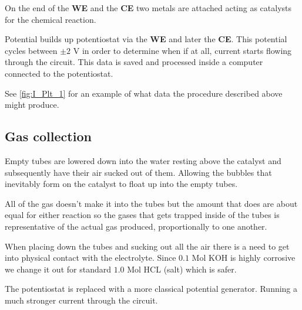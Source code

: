 \documentclass[twocolumn, floatfix]{revtex4-2}
\begin{document}
On the end of the \textbf{WE} and the \textbf{CE} two metals are attached acting 
as catalysts for the chemical reaction. 

\par
Potential builds up potentiostat via the \textbf{WE} and later the \textbf{CE}. This potential cycles
between $\pm 2$ V in order to determine when if at all, current starts flowing through the circuit.
This data is saved and processed inside a computer connected to the potentiostat.

See \ref{fig:I_Plt_1} for an example of what data the procedure described above might produce.

\subsection{Gas collection}
Empty tubes are lowered down into the water resting above the catalyst and subsequently
have their air sucked out of them. Allowing the bubbles that inevitably form on the
catalyst to float up into the empty tubes. 

\par 
All of the gas doesn't make it into the tubes but the amount that does are about equal
for either reaction so the gases that gets trapped inside of the tubes is representative
of the actual gas produced, proportionally to one another.

\par 
When placing down the tubes and sucking out all the air there is a need to get into 
physical contact with the electrolyte. Since $0.1$ Mol KOH is highly corrosive we change 
it out for standard $1.0$ Mol HCL (salt) which is safer.
\par 
The potentiostat is replaced with a more classical potential generator. Running a much
stronger current through the circuit.
\par
\end{document}
